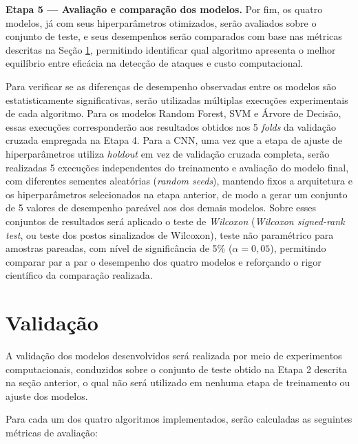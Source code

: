 \textbf{Etapa 5 — Avaliação e comparação dos modelos.} Por fim, os quatro modelos, já com seus hiperparâmetros otimizados, serão avaliados sobre o conjunto de teste, e seus desempenhos serão comparados com base nas métricas descritas na Seção \ref{sec:validacao}, permitindo identificar qual algoritmo apresenta o melhor equilíbrio entre eficácia na detecção de ataques e custo computacional.

Para verificar se as diferenças de desempenho observadas entre os modelos são estatisticamente significativas, serão utilizadas múltiplas execuções experimentais de cada algoritmo. Para os modelos Random Forest, SVM e Árvore de Decisão, essas execuções corresponderão aos resultados obtidos nos 5 \textit{folds} da validação cruzada empregada na Etapa 4. Para a CNN, uma vez que a etapa de ajuste de hiperparâmetros utiliza \textit{holdout} em vez de validação cruzada completa, serão realizadas 5 execuções independentes do treinamento e avaliação do modelo final, com diferentes sementes aleatórias (\textit{random seeds}), mantendo fixos a arquitetura e os hiperparâmetros selecionados na etapa anterior, de modo a gerar um conjunto de 5 valores de desempenho pareável aos dos demais modelos. Sobre esses conjuntos de resultados será aplicado o teste de \textit{Wilcoxon} (\textit{Wilcoxon signed-rank test}, ou teste dos postos sinalizados de Wilcoxon), teste não paramétrico para amostras pareadas, com nível de significância de 5\% ($\alpha = 0,05$), permitindo comparar par a par o desempenho dos quatro modelos e reforçando o rigor científico da comparação realizada.

\section{Validação}\label{sec:validacao}

A validação dos modelos desenvolvidos será realizada por meio de experimentos computacionais, conduzidos sobre o conjunto de teste obtido na Etapa 2 descrita na seção anterior, o qual não será utilizado em nenhuma etapa de treinamento ou ajuste dos modelos.

Para cada um dos quatro algoritmos implementados, serão calculadas as seguintes métricas de avaliação:

